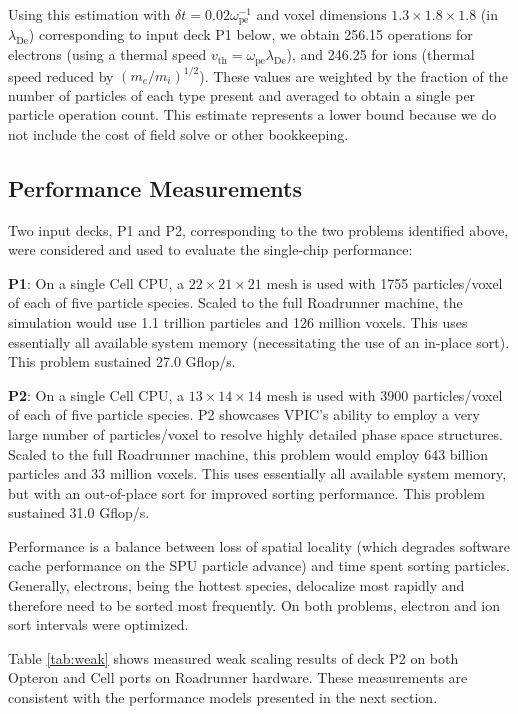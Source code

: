 \documentclass[letter,10pt]{article}
\newcommand{\lde}      {\lambda_{\mathrm{De}}}
\newcommand{\wpe}      {\omega_{\mathrm{pe}}}
\begin{document}
Using this estimation with $\delta t = 0.02 \wpe^{-1}$ and voxel 
dimensions $1.3 \times 1.8 \times 1.8$ (in $\lde$) corresponding to
input deck P1 below, we obtain 
256.15 operations for electrons (using a thermal speed $v_{\mathrm{th}} =
\wpe \lde$), and 246.25 for ions (thermal speed reduced by
$(m_e/m_i)^{1/2}$).  These values are weighted by the fraction of 
the number of particles of each type present and averaged to obtain 
a single per particle operation count.  This estimate represents a 
lower bound because we do not include the cost of field solve or 
other bookkeeping.

\subsection{Performance Measurements}

Two input decks, P1 and P2, corresponding to the two problems
identified above, were considered and used to evaluate the
single-chip performance:

\textbf{P1}:  On a single Cell CPU, a $22 \times 21 \times 21$ mesh 
is used with 1755 particles/voxel of each of five particle species.
Scaled to the full Roadrunner machine, the simulation would
use 1.1 trillion particles and 126 million voxels.  This uses
essentially all available system memory (necessitating the use of an
in-place sort).  This problem sustained 27.0 Gflop/s.

\textbf{P2}:  On a single Cell CPU, a $13 \times 14 \times 14$ mesh 
is used with 3900 particles/voxel of each of five particle species.
P2 showcases VPIC's ability to employ a very large number of
particles/voxel to resolve highly detailed phase space structures.
Scaled to the full Roadrunner machine, this problem would employ 643
billion particles and 33 million voxels. This uses essentially all
available system memory, but with an out-of-place sort for improved
sorting performance.  This problem sustained 31.0 Gflop/s.

Performance is a balance between loss of spatial locality (which
degrades software cache performance on the SPU particle advance) and
time spent sorting particles.  Generally, electrons, being the hottest
species, delocalize most rapidly and therefore need to be sorted most 
frequently.  On both problems, electron and ion sort intervals were 
optimized.  

Table \ref{tab:weak} shows measured weak scaling results of deck P2 on
both Opteron and Cell ports on Roadrunner hardware.  These
measurements are consistent with the performance models presented in
the next section.
\end{document}

